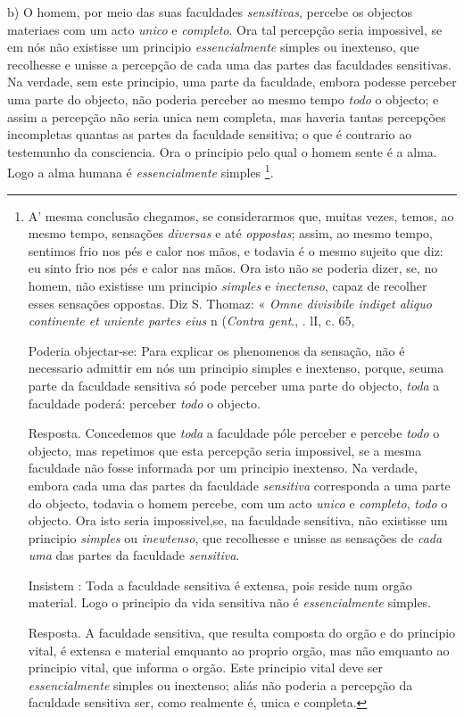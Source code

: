 b) O homem, por meio das suas faculdades \emph{sensitivas}, percebe os objectos materiaes com um acto \emph{unico} e \emph{completo}. Ora tal percepção seria impossivel, se em nós não existisse um principio \emph{essencialmente} simples ou inextenso, que recolhesse e unisse a percepção de cada uma das partes das faculdades sensitivas. Na verdade, sem este principio, uma parte da faculdade, embora podesse perceber uma parte do objecto, não poderia perceber ao mesmo tempo \emph{todo} o objecto; e assim a percepção não seria unica nem completa, mas haveria tantas percepções incompletas quantas as partes da faculdade sensitiva; o que é contrario ao testemunho da consciencia. Ora o principio pelo qual o homem sente é a alma. Logo a alma humana é \emph{essencialmente} simples \footnote{A' mesma conclusão chegamos, se considerarmos que, muitas vezes, temos, ao mesmo tempo, sensações \emph{diversas} e até \emph{oppostas}; assim, ao mesmo tempo, sentimos frio nos pés e calor nos mãos, e todavia é o mesmo sujeito que diz: eu sinto frio nos pés e calor nas mãos. Ora isto não se poderia dizer, se, no homem, não existisse um principio \emph{simples} e \emph{inectenso}, capaz de recolher esses sensações oppostas. Diz S. Thomaz: « \emph{Omne divisibile indiget aliquo continente et uniente partes eius} n (\emph{Contra gent}., \textbar{}. lI, c. 65,\par Poderia objectar-se: Para explicar os phenomenos da sensação, não é necessario admittir em nós um principio simples e inextenso, porque, seuma parte da faculdade sensitiva só pode perceber uma parte do objecto, \emph{toda} a faculdade poderá: perceber \emph{todo} o objecto.\par Resposta. Concedemos que \emph{toda} a faculdade póle perceber e percebe \emph{todo} o objecto, mas repetimos que esta percepção seria impossivel, se a mesma faculdade não fosse informada por um principio inextenso. Na verdade, embora cada uma das partes da faculdade \emph{sensitiva} corresponda a uma parte do objecto, todavia o homem percebe, com um acto \emph{unico} e \emph{completo}, \emph{todo} o objecto. Ora isto seria impossivel,se, na faculdade sensitiva, não existisse um principio \emph{simples} ou \emph{inewtenso}, que recolhesse e unisse as sensações de \emph{cada uma} das partes da faculdade \emph{sensitiva}.\par Insistem : Toda a faculdade sensitiva é extensa, pois reside num orgão material. Logo o principio da vida sensitiva não é \emph{essencialmente} simples.\par Resposta. A faculdade sensitiva, que resulta composta do orgão e do principio vital, é extensa e material emquanto ao proprio orgão, mas não emquanto ao principio vital, que informa o orgão. Este principio vital deve ser \emph{essencialmente} simples ou inextenso; aliás não poderia a percepção da faculdade sensitiva ser, como realmente é, unica e completa.}.

